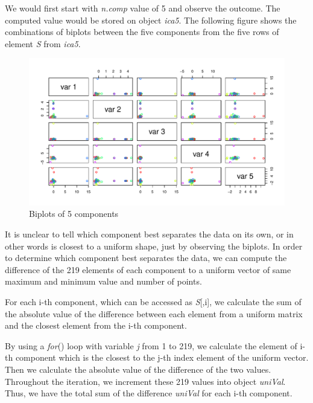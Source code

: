 We would first start with \emph{n.comp} value of 5 and observe the outcome. The computed value would be stored on object \emph{ica5}. The following figure shows the combinations of biplots between the five components from the five rows of element \emph{S} from \emph{ica5}. 

\begin{figure}[H]
    \centering
    \includegraphics[width=15cm]{images/ICA/[5]/[5] 5 x 5 plot.pdf}  
    \caption{Biplots of 5 components}
    \label{fig:[5]5x5biplots]} 
\end{figure}

It is unclear to tell which component best separates the data on its own, or in other words is closest to a uniform shape, just by observing the biplots. In order to determine which component best separates the data, we can compute the difference of the 219 elements of each component to a uniform vector of same maximum and minimum value and number of points.

For each i-th component, which can be accessed as \emph{S}[,i], we calculate the sum of the absolute value of the difference between each element from a uniform matrix and the closest element from the i-th component. 

By using a \emph{for}() loop with variable \emph{j} from 1 to 219, we calculate the element of i-th component which is the closest to the j-th index element of the uniform vector. Then we calculate the absolute value of the difference of the two values. Throughout the iteration, we increment these 219 values into object \emph{uniVal}. Thus, we have the total sum of the difference \emph{uniVal} for each i-th component.

